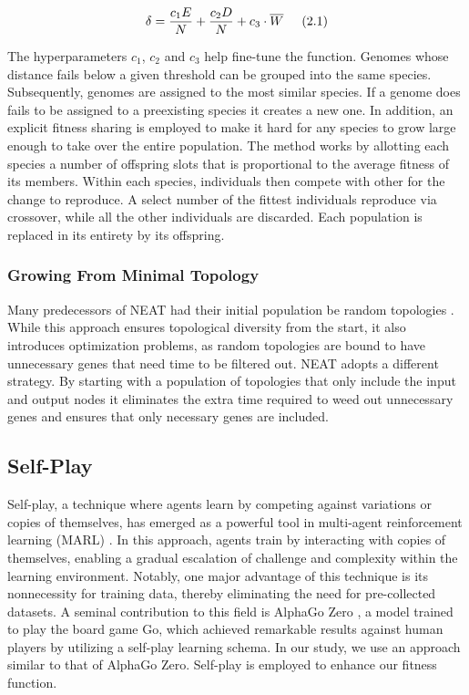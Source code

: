 \documentclass[letterpaper, 12pt]{article}
\begin{document}
\[\delta=\frac{c_1E}{N}+\frac{c_2D}{N}+c_3 \cdot \overline{W} \hspace{0.5cm}\text{(2.1)}\]

The hyperparameters \(c_1\), \(c_2\) and \(c_3\) help fine-tune the function. Genomes
whose distance fails below a given threshold can be grouped into the same species.
Subsequently, genomes are assigned to the most similar species. If a genome does fails
to be assigned to a preexisting species it creates a new one. In addition, an explicit
fitness sharing \cite{goldbergarichardson} is employed to make it hard for any species
to grow large enough to take over the entire population. The method works by allotting
each species a number of offspring slots that is proportional to the average fitness of
its members. Within each species, individuals then compete with other for the change to
reproduce. A select number of the fittest individuals reproduce via crossover, while all
the other individuals are discarded. Each population is replaced in its entirety by its
offspring.

\subsubsection{Growing From Minimal Topology}
Many predecessors of NEAT had their initial population be random topologies
\cite{Gru1996,Xin1999}. While this approach ensures topological diversity from the
start, it also introduces optimization problems, as random topologies are bound to have
unnecessary genes that need time to be filtered out. NEAT adopts a different strategy.
By starting with a population of topologies that only include the input and output nodes
it eliminates the extra time required to weed out unnecessary genes and ensures that
only necessary genes are included.

\subsection{Self-Play}
Self-play, a technique where agents learn by competing against variations or copies of
themselves, has emerged as a powerful tool in multi-agent reinforcement learning (MARL)
\cite{5392560}. In this approach, agents train by interacting with copies of themselves,
enabling a gradual escalation of challenge and complexity within the learning
environment. Notably, one major advantage of this technique is its nonnecessity for
training data, thereby eliminating the need for pre-collected datasets. A seminal
contribution to this field is AlphaGo Zero \cite{silver2017mastering}, a model trained
to play the board game Go, which achieved remarkable results against human players by
utilizing a self-play learning schema. In our study, we use an approach similar to that
of AlphaGo Zero. Self-play is employed to enhance our fitness function.
\end{document}
